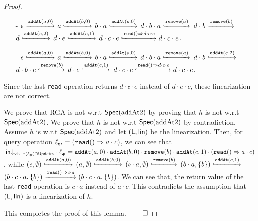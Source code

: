 \begin {proof}
\begin{itemize}
\item[-] $\epsilon \specarrow{\alabelshort[\mathtt{addAt}]{a,0}}$ $a \specarrow{\alabelshort[\mathtt{addAt}]{b,0}}$ $b \cdot a \specarrow{\alabelshort[\mathtt{addAt}]{d,0}}$ $d \cdot b \cdot a \specarrow{\alabelshort[\mathtt{remove}]{a}}$ $d \cdot b \specarrow{\alabelshort[\mathtt{remove}]{b}}$ $d \specarrow{\alabelshort[\mathtt{addAt}]{e,2}}$ $d \cdot e \specarrow{\alabelshort[\mathtt{addAt}]{c,1}}$ $d \cdot c \cdot e \specarrow{\alabellong[\mathtt{read}]{}{d \cdot c \cdot e}{}} d \cdot c \cdot e$.

\item[-] $\epsilon \specarrow{\alabelshort[\mathtt{addAt}]{a,0}}$ $a \specarrow{\alabelshort[\mathtt{addAt}]{b,0}}$ $b \cdot a \specarrow{\alabelshort[\mathtt{addAt}]{d,0}}$ $d \cdot b \cdot a \specarrow{\alabelshort[\mathtt{remove}]{a}}$ $d \cdot b \specarrow{\alabelshort[\mathtt{addAt}]{e,2}}$ $d \cdot b \cdot e \specarrow{\alabelshort[\mathtt{remove}]{b}}$ $d \cdot e \specarrow{\alabelshort[\mathtt{addAt}]{c,1}}$ $d \cdot c \cdot e \specarrow{\alabellong[\mathtt{read}]{}{d \cdot c \cdot e}{}} d \cdot c \cdot e$.
\end{itemize}

Since the last {\tt read} operation returns $d \cdot c \cdot e$ instead of $d \cdot e \cdot c$, these linearization are not correct.

We prove that RGA is not \crdtlinearizable{} w.r.t $\specAddatTwo$ by proving that $h$ is not \crdtlinearizable{} w.r.t $\specAddatTwo$. We prove that $h$ is not \crdtlinearizable{} w.r.t $\specAddatTwo$ by contradiction. Assume $h$ is \crdtlinearizable{} w.r.t $\specAddatTwo$ and let $(\alabelset, \alinord)$ be the linearization. Then, for query operation $\alabel_{\mathsf{qr}} = (\alabellong[\mathtt{read}]{}{a \cdot c}{})$, we can see that $\alinord\!\downarrow_{\avisord^{-1}(\alabel_{\mathsf{qr}})\cap \updates}\!\cdot\ \alabel_{\mathsf{qr}} = \alabelshort[\mathtt{addAt}]{a,0} \cdot \alabelshort[\mathtt{addAt}]{b,0} \cdot \alabelshort[\mathtt{remove}]{b} \cdot \alabelshort[\mathtt{addAt}]{c,1} \cdot (\alabellong[\mathtt{read}]{}{a \cdot c}{})$, while $(\epsilon,\emptyset) \specarrow{\alabelshort[\mathtt{addAt}]{a,0}}$ $(a,\emptyset) \specarrow{\alabelshort[\mathtt{addAt}]{b,0}}$ $(b \cdot a,\emptyset) \specarrow{\alabelshort[\mathtt{remove}]{b}}$ $(b \cdot a, \{ b \}) \specarrow{\alabelshort[\mathtt{addAt}]{c,1}}$ $(b \cdot c \cdot a, \{ b \}) \specarrow{\alabellong[\mathtt{read}]{}{c \cdot a}{}} (b \cdot c \cdot a, \{ b \})$. We can see that, the return value of the last {\tt read} operation is $c \cdot a$ instead of $a \cdot c$. This contradicts the assumption that $(\alabelset, \alinord)$ is a linearization of $h$.

This completes the proof of this lemma. $\qed$
\end {proof}




